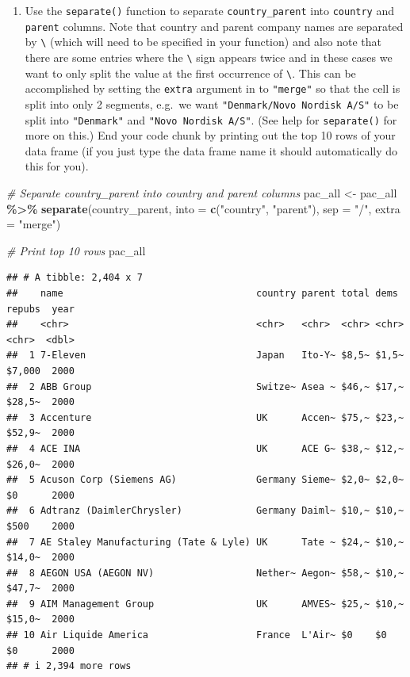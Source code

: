 \documentclass[
]{article}
\newenvironment{Shaded}{\begin{snugshade}}{\end{snugshade}}
\newcommand{\AttributeTok}[1]{\textcolor[rgb]{0.13,0.29,0.53}{#1}}
\newcommand{\CommentTok}[1]{\textcolor[rgb]{0.56,0.35,0.01}{\textit{#1}}}
\newcommand{\FunctionTok}[1]{\textcolor[rgb]{0.13,0.29,0.53}{\textbf{#1}}}
\newcommand{\NormalTok}[1]{#1}
\newcommand{\OtherTok}[1]{\textcolor[rgb]{0.56,0.35,0.01}{#1}}
\newcommand{\SpecialCharTok}[1]{\textcolor[rgb]{0.81,0.36,0.00}{\textbf{#1}}}
\newcommand{\StringTok}[1]{\textcolor[rgb]{0.31,0.60,0.02}{#1}}
\providecommand{\tightlist}{%
  \setlength{\itemsep}{0pt}\setlength{\parskip}{0pt}}
\begin{document}
\begin{enumerate}
\def\labelenumi{\arabic{enumi}.}
\setcounter{enumi}{1}
\tightlist
\item
  Use the \texttt{separate()} function to separate
  \texttt{country\_parent} into \texttt{country} and \texttt{parent}
  columns. Note that country and parent company names are separated by
  \texttt{\textbackslash{}} (which will need to be specified in your
  function) and also note that there are some entries where the
  \texttt{\textbackslash{}} sign appears twice and in these cases we
  want to only split the value at the first occurrence of
  \texttt{\textbackslash{}}. This can be accomplished by setting the
  \texttt{extra} argument in to \texttt{"merge"} so that the cell is
  split into only 2 segments, e.g.~we want
  \texttt{"Denmark/Novo\ Nordisk\ A/S"} to be split into
  \texttt{"Denmark"} and \texttt{"Novo\ Nordisk\ A/S"}. (See help for
  \texttt{separate()} for more on this.) End your code chunk by printing
  out the top 10 rows of your data frame (if you just type the data
  frame name it should automatically do this for you).
\end{enumerate}

\begin{Shaded}
\begin{Highlighting}[]
\CommentTok{\# Separate country\_parent into country and parent columns}
\NormalTok{pac\_all }\OtherTok{\textless{}{-}}\NormalTok{ pac\_all }\SpecialCharTok{\%\textgreater{}\%}
  \FunctionTok{separate}\NormalTok{(country\_parent, }\AttributeTok{into =} \FunctionTok{c}\NormalTok{(}\StringTok{"country"}\NormalTok{, }\StringTok{"parent"}\NormalTok{), }\AttributeTok{sep =} \StringTok{"/"}\NormalTok{, }\AttributeTok{extra =} \StringTok{"merge"}\NormalTok{)}

\CommentTok{\# Print top 10 rows}
\NormalTok{pac\_all}
\end{Highlighting}
\end{Shaded}

\begin{verbatim}
## # A tibble: 2,404 x 7
##    name                                  country parent total dems  repubs  year
##    <chr>                                 <chr>   <chr>  <chr> <chr> <chr>  <dbl>
##  1 7-Eleven                              Japan   Ito-Y~ $8,5~ $1,5~ $7,000  2000
##  2 ABB Group                             Switze~ Asea ~ $46,~ $17,~ $28,5~  2000
##  3 Accenture                             UK      Accen~ $75,~ $23,~ $52,9~  2000
##  4 ACE INA                               UK      ACE G~ $38,~ $12,~ $26,0~  2000
##  5 Acuson Corp (Siemens AG)              Germany Sieme~ $2,0~ $2,0~ $0      2000
##  6 Adtranz (DaimlerChrysler)             Germany Daiml~ $10,~ $10,~ $500    2000
##  7 AE Staley Manufacturing (Tate & Lyle) UK      Tate ~ $24,~ $10,~ $14,0~  2000
##  8 AEGON USA (AEGON NV)                  Nether~ Aegon~ $58,~ $10,~ $47,7~  2000
##  9 AIM Management Group                  UK      AMVES~ $25,~ $10,~ $15,0~  2000
## 10 Air Liquide America                   France  L'Air~ $0    $0    $0      2000
## # i 2,394 more rows
\end{verbatim}
\end{document}
